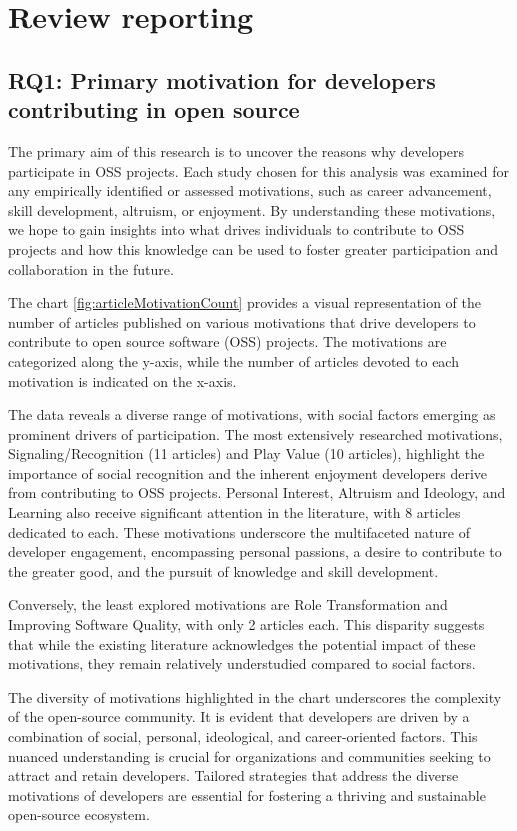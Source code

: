 \section{Review reporting}
\subsection{RQ1: Primary motivation for developers contributing in open source}

The primary aim of this research is to uncover the reasons why developers participate in OSS projects. Each study chosen for this analysis was examined for any empirically identified or assessed motivations, such as career advancement, skill development, altruism, or enjoyment. By understanding these motivations, we hope to gain insights into what drives individuals to contribute to OSS projects and how this knowledge can be used to foster greater participation and collaboration in the future.

The chart \ref{fig:articleMotivationCount} provides a visual representation of the number of articles published on various motivations that drive developers to contribute to open source software (OSS) projects. The motivations are categorized along the y-axis, while the number of articles devoted to each motivation is indicated on the x-axis.

The data reveals a diverse range of motivations, with social factors emerging as prominent drivers of participation. The most extensively researched motivations, Signaling/Recognition (11 articles) and Play Value (10 articles), highlight the importance of social recognition and the inherent enjoyment developers derive from contributing to OSS projects. Personal Interest, Altruism and Ideology, and Learning also receive significant attention in the literature, with 8 articles dedicated to each. These motivations underscore the multifaceted nature of developer engagement, encompassing personal passions, a desire to contribute to the greater good, and the pursuit of knowledge and skill development.

Conversely, the least explored motivations are Role Transformation and Improving Software Quality, with only 2 articles each. This disparity suggests that while the existing literature acknowledges the potential impact of these motivations, they remain relatively understudied compared to social factors.

The diversity of motivations highlighted in the chart underscores the complexity of the open-source community. It is evident that developers are driven by a combination of social, personal, ideological, and career-oriented factors. This nuanced understanding is crucial for organizations and communities seeking to attract and retain developers. Tailored strategies that address the diverse motivations of developers are essential for fostering a thriving and sustainable open-source ecosystem.

